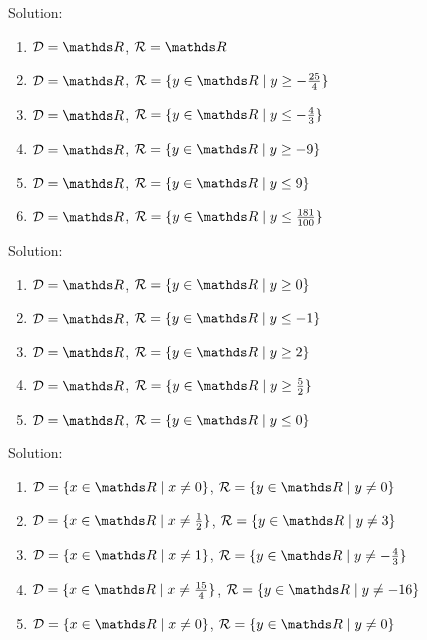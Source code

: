 \documentclass[12pt]{article} %
\begin{document}
\begin{qstn}
  Solution:
  \begin{enumerate}[label=(\alph*)]
      \item $\mathcal{D} = \R$, $\mathcal{R} = \R$
      \item $\mathcal{D} = \R$, $\mathcal{R} = \{y \in \R \mid y \geq -\frac{25}{4}\} $
      \item $\mathcal{D} = \R$, $\mathcal{R} = \{y \in \R \mid y \leq -\frac{4}{3}\} $
      \item $\mathcal{D} = \R$, $\mathcal{R} = \{y \in \R \mid y \geq -9\} $
      \item $\mathcal{D} = \R$, $\mathcal{R} = \{y \in \R \mid y \leq 9\} $
      \item $\mathcal{D} = \R$, $\mathcal{R} = \{y \in \R \mid y \leq \frac{181}{100}\} $
  \end{enumerate}
\end{qstn}

\begin{qstn}
  Solution:
  \begin{enumerate}[label=(\alph*)]
      \item $\mathcal{D} = \R$, $\mathcal{R} = \{y \in \R \mid y \geq 0\} $
      \item $\mathcal{D} = \R$, $\mathcal{R} = \{y \in \R \mid y \leq -1\} $
      \item $\mathcal{D} = \R$, $\mathcal{R} = \{y \in \R \mid y \geq 2\} $
      \item $\mathcal{D} = \R$, $\mathcal{R} = \{y \in \R \mid y \geq \frac{5}{2}\} $
      \item $\mathcal{D} = \R$, $\mathcal{R} = \{y \in \R \mid y \leq 0\}  $
  \end{enumerate}
\end{qstn}

\begin{qstn}
  Solution:
  \begin{enumerate}[label=(\alph*)]
      \item $\mathcal{D} = \{x\in \R \mid x \neq 0\} $, $\mathcal{R} = \{y \in \R \mid y \neq 0\} $
      \item $\mathcal{D} = \{x\in \R \mid x \neq \frac{1}{2}\} $, $\mathcal{R} = \{y \in \R \mid y \neq 3\} $
      \item $\mathcal{D} = \{x\in \R \mid x \neq 1\} $, $\mathcal{R} = \{y \in \R \mid y \neq -\frac{4}{3}\} $
      \item $\mathcal{D} = \{x\in \R \mid x \neq \frac{15}{4}\} $, $\mathcal{R} = \{y \in \R \mid y \neq -16\} $
      \item $\mathcal{D} = \{x\in \R \mid x \neq 0\} $, $\mathcal{R} = \{y \in \R \mid y \neq 0\} $
  \end{enumerate}
\end{qstn}
\end{document}
